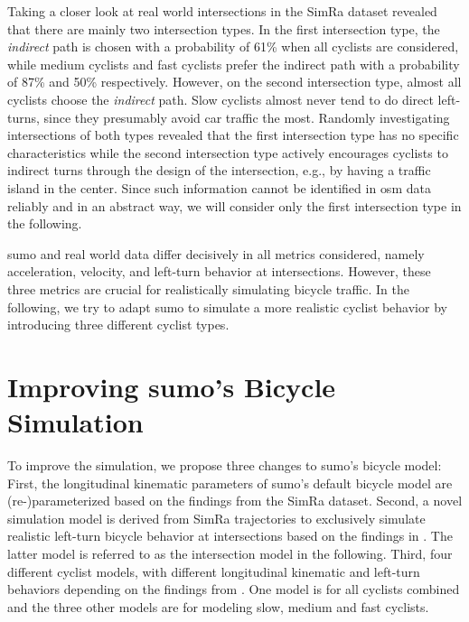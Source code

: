 Taking a closer look at real world intersections in the SimRa dataset revealed that there are mainly two intersection types.
In the first intersection type, the \textit{indirect} path is chosen with a probability of \num{61}\% when all cyclists are considered, while medium cyclists and fast cyclists prefer the indirect path with a probability of \num{87}\% and \num{50}\% respectively.
However, on the second intersection type, almost all cyclists choose the \textit{indirect} path.
Slow cyclists almost never tend to do direct left-turns, since they presumably avoid car traffic the most.
Randomly investigating intersections of both types revealed that the first intersection type has no specific characteristics while the second intersection type actively encourages cyclists to indirect turns through the design of the intersection, e.g., by having a traffic island in the center.
Since such information cannot be identified in \ac{osm} data reliably and in an abstract way, we will consider only the first intersection type in the following.

\ac{sumo} and real world data differ decisively in all metrics considered, namely acceleration, velocity, and left-turn behavior at intersections.
However, these three metrics are crucial for realistically simulating bicycle traffic.
In the following, we try to adapt \ac{sumo} to simulate a more realistic cyclist behavior by introducing three different cyclist types.


\section{Improving \ac{sumo}'s Bicycle Simulation}
\label{sec:improving_sumos_bicycle_simulation}
To improve the simulation, we propose three changes to \ac{sumo}'s bicycle model:
First, the longitudinal kinematic parameters of \ac{sumo}'s default bicycle model are \mbox{(re-)}parameterized based on the findings from the SimRa dataset.
Second, a novel simulation model is derived from SimRa trajectories to exclusively simulate realistic left-turn bicycle behavior at intersections based on the findings in .
The latter model is referred to as the intersection model in the following.
Third, four different cyclist models, with different longitudinal kinematic and left-turn behaviors depending on the findings from .
One model is for all cyclists combined and the three other models are for modeling slow, medium and fast cyclists.


